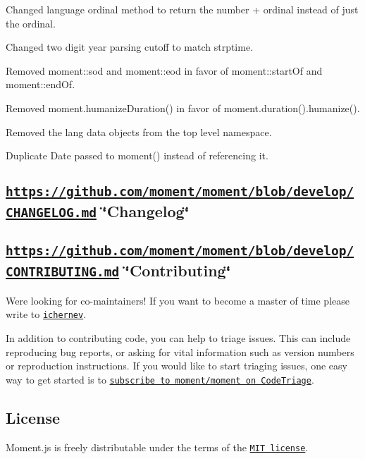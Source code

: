 \begin{DoxyItemize}
\item Changed language ordinal method to return the number + ordinal instead of just the ordinal.
\item Changed two digit year parsing cutoff to match strptime.
\item Removed {\ttfamily moment\+::sod} and {\ttfamily moment\+::eod} in favor of {\ttfamily moment\+::start\+Of} and {\ttfamily moment\+::end\+Of}.
\item Removed {\ttfamily moment.\+humanize\+Duration()} in favor of {\ttfamily moment.\+duration().humanize()}.
\item Removed the lang data objects from the top level namespace.
\item Duplicate {\ttfamily Date} passed to {\ttfamily moment()} instead of referencing it.
\end{DoxyItemize}

\subsection*{\href{https://github.com/moment/moment/blob/develop/CHANGELOG.md}{\tt https\+://github.\+com/moment/moment/blob/develop/\+C\+H\+A\+N\+G\+E\+L\+O\+G.\+md} \char`\"{}\+Changelog\char`\"{}}

\subsection*{\href{https://github.com/moment/moment/blob/develop/CONTRIBUTING.md}{\tt https\+://github.\+com/moment/moment/blob/develop/\+C\+O\+N\+T\+R\+I\+B\+U\+T\+I\+N\+G.\+md} \char`\"{}\+Contributing\char`\"{} \href{https://www.codetriage.com/moment/moment}{\tt }}

We\textquotesingle{}re looking for co-\/maintainers! If you want to become a master of time please write to \href{https://github.com/ichernev}{\tt ichernev}.

In addition to contributing code, you can help to triage issues. This can include reproducing bug reports, or asking for vital information such as version numbers or reproduction instructions. If you would like to start triaging issues, one easy way to get started is to \href{https://www.codetriage.com/moment/moment}{\tt subscribe to moment/moment on Code\+Triage}.

\subsection*{License}

Moment.\+js is freely distributable under the terms of the \href{https://github.com/moment/moment/blob/develop/LICENSE}{\tt M\+IT license}.

\href{https://app.fossa.io/projects/git%2Bhttps%3A%2F%2Fgithub.com%2Fmoment%2Fmoment?ref=badge_large}{\tt } 